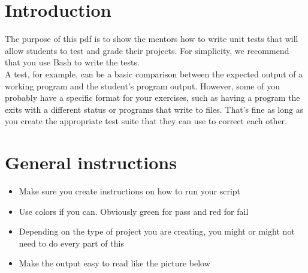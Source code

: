 \documentclass{42-en}
\begin{document}
\chapter{Introduction}

    The purpose of this pdf is to show the mentors how to write unit
    tests that will allow students to test and grade their projects.
    For simplicity, we recommend that you use Bash to write the tests.\\

    A test, for example, can be a basic comparison between
    the expected output of a working program and the student’s
    program output. However, some of you probably have a specific
    format for your exercises, such as having a program the exits with
    a different status or programs that write to files. That's fine as long as
    you create the appropriate test suite that they can use to correct each other.

\chapter{General instructions}

    \begin{itemize}\itemsep1pt
      \item Make sure you create instructions on how to run your script
     \item Use colors if you can. Obviously green for pass and red for fail
     \item Depending on the type of project you are creating, you might or might not need to do every part of this
     \item Make the output easy to read like the picture below\\
    \end{itemize}
\end{document}
